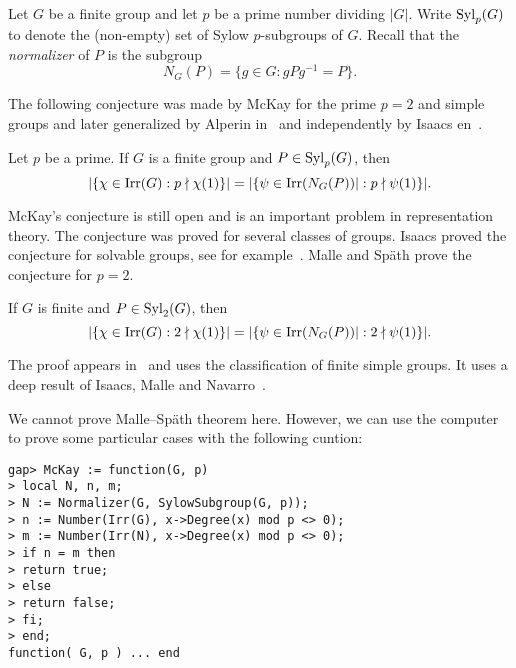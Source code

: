 \chapter{}

\label{McKay}

Let $G$ be a finite group and let $p$ be a prime number dividing
$|G|$. Write $\mathrm{Syl}_p(G)$ to denote the (non-empty) set of Sylow 
$p$-subgroups of $G$. Recall that 
the \emph{normalizer} of $P$ is the subgroup
\[
N_G(P)=\{g\in G:gPg^{-1}=P\}.
\]

The following conjecture was made by McKay for the prime $p=2$ and simple groups 
and later generalized by Alperin in~\cite{MR0404417} and independently
by Isaacs en~\cite{MR332945}. 

\begin{conjecture}[McKay]
\label{conjecture:McKay}
Let $p$ be a prime. If  
$G$ is a finite group and $P\in\mathrm{Syl}_p(G)$, then 
\[
|\{\chi\in\operatorname{Irr}(G):p\nmid \chi(1)\}|
=|\{\psi\in\operatorname{Irr}(N_G(P))|:p\nmid\psi(1)\}|.
\]
\end{conjecture}

McKay's conjecture is still open and is an important problem in representation theory. 
The conjecture was proved for several classes of groups. Isaacs 
proved the conjecture for solvable groups, see for example~\cite{MR332945,MR3791517}. 
Malle and Sp\"ath prove the conjecture for $p=2$. 

\begin{theorem}
If $G$ is finite and $P\in\mathrm{Syl}_2(G)$,
then 
\[
|\{\chi\in\operatorname{Irr}(G):2\nmid \chi(1)\}|
=|\{\psi\in\operatorname{Irr}(N_G(P))|:2\nmid\psi(1)\}|.
\]
\end{theorem}

The proof appears in~\cite{MR3549625} and uses the classification of 
finite simple groups. It uses a deep result of 
Isaacs, Malle and Navarro~\cite{MR2336079}. 

We cannot prove Malle--Sp\"ath theorem here. However, 
we can use the computer to prove some particular cases
with the following cuntion: 

\begin{lstlisting}
gap> McKay := function(G, p)
> local N, n, m;
> N := Normalizer(G, SylowSubgroup(G, p));
> n := Number(Irr(G), x->Degree(x) mod p <> 0);
> m := Number(Irr(N), x->Degree(x) mod p <> 0);
> if n = m then
> return true;
> else
> return false;
> fi;
> end;
function( G, p ) ... end
\end{lstlisting}

